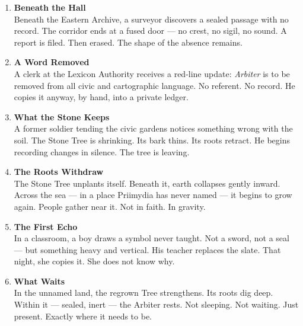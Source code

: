 \documentclass[9pt]{article}
\begin{document}
\begin{center}
\begin{enumerate}
    \item \textbf{Beneath the Hall} \\
    Beneath the Eastern Archive, a surveyor discovers a sealed passage with no record. The corridor ends at a fused door — no crest, no sigil, no sound. A report is filed. Then erased. The shape of the absence remains.

    \vspace{.3in}
    \item \textbf{A Word Removed} \\
    A clerk at the Lexicon Authority receives a red-line update: \textit{Arbiter} is to be removed from all civic and cartographic language. No referent. No record. He copies it anyway, by hand, into a private ledger.

    \vspace{.3in}
    \item \textbf{What the Stone Keeps} \\
    A former soldier tending the civic gardens notices something wrong with the soil. The Stone Tree is shrinking. Its bark thins. Its roots retract. He begins recording changes in silence. The tree is leaving.

    \vspace{.3in}
    \item \textbf{The Roots Withdraw} \\
    The Stone Tree unplants itself. Beneath it, earth collapses gently inward. Across the sea — in a place Priimydia has never named — it begins to grow again. People gather near it. Not in faith. In gravity.

    \vspace{.3in}
    \item \textbf{The First Echo} \\
     In a classroom, a boy draws a symbol never taught. Not a sword, not a seal — but something heavy and vertical. His teacher replaces the slate. That night, she copies it. She does not know why.

    \vspace{.3in}
    \item \textbf{What Waits} \\
    In the unnamed land, the regrown Tree strengthens. Its roots dig deep. Within it — sealed, inert — the Arbiter rests. Not sleeping. Not waiting. Just present. Exactly where it needs to be.

\end{enumerate}
\end{center}
\end{document}
